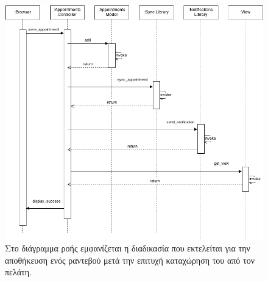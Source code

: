 \begin{figure}%
\centering
\includegraphics[width=150mm]{images/sd-save-appointment.png}
\caption{Στο διάγραμμα ροής εμφανίζεται η διαδικασία που εκτελείται για την αποθήκευση ενός ραντεβού μετά την επιτυχή καταχώρηση του από τον πελάτη.}
\label{sd-save-appointment}
\end{figure}


